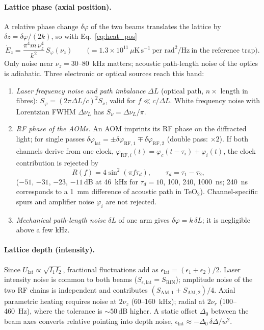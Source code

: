\documentclass[11pt,a4paper]{article}
\newcommand{\Ulat}{U_\mathrm{lat}}
\begin{document}
\paragraph{Lattice phase (axial position).} A relative phase change $\delta\varphi$ of the two beams translates the lattice by $\delta z=\delta\varphi/(2k)$, so with Eq.~\eqref{eq:heat_pos}
\begin{equation}
\dot E_z=\frac{\pi^4 m\,\nu_z^4}{k^2}\,S_\varphi(\nu_z)\qquad\bigl(=1.3\times10^{11}\,\mu\mathrm K\,\mathrm s^{-1}\ \text{per rad}^2/\mathrm{Hz}\ \text{in the reference trap}\bigr).
\end{equation}
Only noise near $\nu_z=30$--\SI{80}{kHz} matters; acoustic path-length noise of the optics is adiabatic. Three electronic or optical sources reach this band:
\begin{enumerate}[leftmargin=*]
\item \emph{Laser frequency noise and path imbalance} $\Delta L$ (optical path, $n\times$ length in fibres): $S_\varphi=(2\pi\Delta L/c)^2 S_\nu$, valid for $f\ll c/\Delta L$. White frequency noise with Lorentzian FWHM $\Delta\nu_L$ has $S_\nu=\Delta\nu_L/\pi$.
\item \emph{RF phase of the AOMs.} An AOM imprints its RF phase on the diffracted light; for single passes $\delta\varphi_\mathrm{lat}=\pm\delta\varphi_\mathrm{RF,1}\mp\delta\varphi_\mathrm{RF,2}$ (double pass: $\times2$). If both channels derive from one clock, $\varphi_{\mathrm{RF},i}(t)=\varphi_c(t-\tau_i)+\varphi_i(t)$, the clock contribution is rejected by
\begin{equation}
R(f)=4\sin^2(\pi f\tau_d),\qquad \tau_d=\tau_1-\tau_2 ,
\end{equation}
($-51$, $-31$, $-23$, $-11$\,dB at \SI{46}{kHz} for $\tau_d=10$, 100, 240, \SI{1000}{ns}; \SI{240}{ns} corresponds to a \SI{1}{mm} difference of acoustic path in TeO$_2$). Channel-specific spurs and amplifier noise $\varphi_i$ are not rejected.
\item \emph{Mechanical path-length noise} $\delta L$ of one arm gives $\delta\varphi=k\,\delta L$; it is negligible above a few kHz.
\end{enumerate}

\paragraph{Lattice depth (intensity).} Since $\Ulat\propto\sqrt{I_1I_2}$, fractional fluctuations add as $\epsilon_\mathrm{lat}=(\epsilon_1+\epsilon_2)/2$. Laser intensity noise is common to both beams ($S_{\epsilon,\mathrm{lat}}=S_\mathrm{RIN}$); amplitude noise of the two RF chains is independent and contributes $(S_\mathrm{AM,1}+S_\mathrm{AM,2})/4$. Axial parametric heating requires noise at $2\nu_z$ (60--\SI{160}{kHz}); radial at $2\nu_r$ (100--\SI{460}{Hz}), where the tolerance is $\sim50$\,dB higher. A static offset $\Delta_0$ between the beam axes converts relative pointing into depth noise, $\epsilon_\mathrm{lat}\approx-\Delta_0\,\delta\Delta/w^2$.
\end{document}
